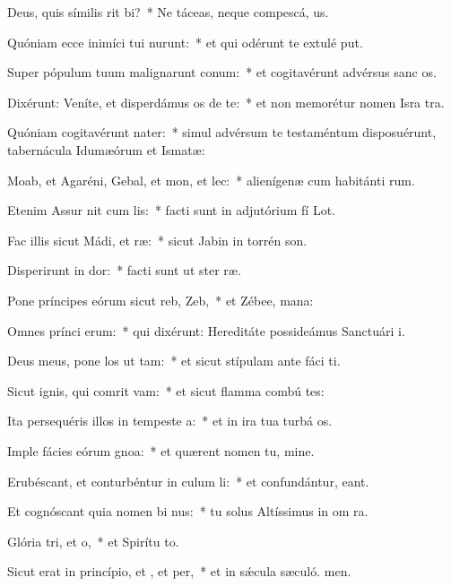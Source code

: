 \item Deus, quis símilis rit bi?~* Ne táceas, neque compescá, us.
\item Quóniam ecce inimíci tui nurunt:~* et qui odérunt te extulé put.
\item Super pópulum tuum malignarunt conum:~* et cogitavérunt advérsus sanc os.
\item Dixérunt: Veníte, et disperdámus os de te:~* et non memorétur nomen Isra tra.
\item Quóniam cogitavérunt nater:~* simul advérsum te testaméntum disposuérunt, tabernácula Idumæórum et Ismatæ:
\item Moab, et Agaréni, Gebal, et mon, et lec:~* alienígenæ cum habitánti rum.
\item Etenim Assur nit cum lis:~* facti sunt in adjutórium fí Lot.
\item Fac illis sicut Mádi, et ræ:~* sicut Jabin in torrén son.
\item Disperirunt in dor:~* facti sunt ut ster ræ.
\item Pone príncipes eórum sicut reb,  Zeb,~* et Zébee,  mana:
\item Omnes prínci erum:~* qui dixérunt: Hereditáte possideámus Sanctuári i.
\item Deus meus, pone los ut tam:~* et sicut stípulam ante fáci ti.
\item Sicut ignis, qui comrit vam:~* et sicut flamma combú tes:
\item Ita persequéris illos in tempeste a:~* et in ira tua turbá os.
\item Imple fácies eórum gnoa:~* et quærent nomen tu, mine.
\item Erubéscant, et conturbéntur in culum li:~* et confundántur,  eant.
\item Et cognóscant quia nomen bi nus:~* tu solus Altíssimus in om ra.
\item Glória tri, et o,~* et Spirítu to.
\item Sicut erat in princípio, et , et per,~* et in sǽcula sæculó. men.
